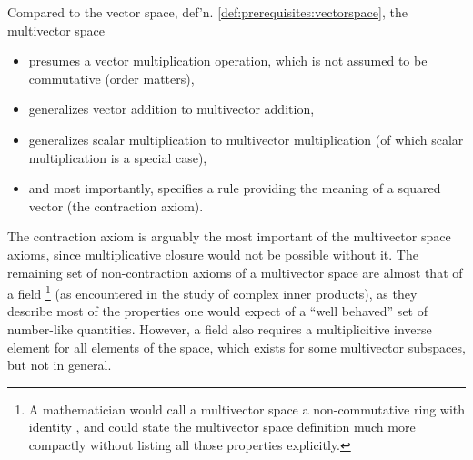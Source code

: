 Compared to the vector space, def'n. \ref{def:prerequisites:vectorspace}, the multivector space

\begin{itemize}
\item presumes a vector multiplication operation, which is not assumed to be commutative (order matters),
\item generalizes vector addition to multivector addition,
\item generalizes scalar multiplication to multivector multiplication (of which scalar multiplication is a special case),
\item and most importantly, specifies a rule providing the meaning of a squared vector (the contraction axiom).
\end{itemize}

The contraction axiom is arguably the most important of the multivector space axioms, since multiplicative closure would not be possible without it.
The remaining set of non-contraction axioms of a multivector space are almost that of a field
\footnote{A mathematician would call a multivector space a non-commutative ring with identity \citep{van1943modern}, and could state the multivector space definition much more compactly without listing all those properties explicitly.}
(as encountered in the study of complex inner products),
as they describe most of the properties one
would expect of a ``well behaved'' set of number-like quantities.
However, a field also requires a multiplicitive inverse element for all elements of the space, which exists for some multivector subspaces, but not in general.


